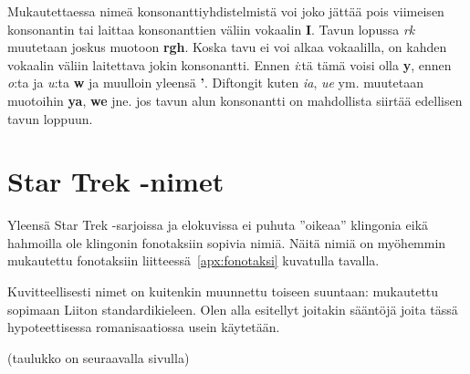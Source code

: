 \documentclass{book}
\begin{document}
Mukautettaessa nimeä konsonanttiyhdistelmistä voi joko jättää pois viimeisen konsonantin tai laittaa konsonanttien väliin vokaalin \textbf{I}. Tavun lopussa \textit{rk} muutetaan joskus muotoon \textbf{rgh}. Koska tavu ei voi alkaa vokaalilla, on kahden vokaalin väliin laitettava jokin konsonantti. Ennen \textit{i}:tä tämä voisi olla \textbf{y}, ennen \textit{o}:ta ja \textit{u}:ta \textbf{w} ja muulloin yleensä \textbf{'}. Diftongit kuten \textit{ia}, \textit{ue} ym. muutetaan muotoihin \textbf{ya}, \textbf{we} jne. jos tavun alun konsonantti on mahdollista siirtää edellisen tavun loppuun.

\chapter{Star Trek -nimet}
\label{apx:startrek}

Yleensä Star Trek -sarjoissa ja elokuvissa ei puhuta ''oikeaa'' klingonia eikä hahmoilla ole klingonin fonotaksiin sopivia nimiä. Näitä nimiä on myöhemmin mukautettu fonotaksiin liitteessä~\ref{apx:fonotaksi} kuvatulla tavalla.

Kuvitteellisesti nimet on kuitenkin muunnettu toiseen suuntaan: mukautettu sopimaan Liiton standardikieleen. Olen alla esitellyt joitakin sääntöjä joita tässä hypoteettisessa romanisaatiossa usein käytetään.

(taulukko on seuraavalla sivulla)

\newcommand{\strule}[2]{\textbf{#1}$\to$\textit{#2}}
\end{document}
